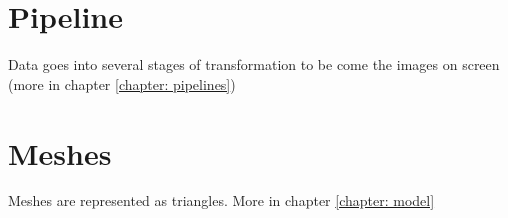 \section{Pipeline}

  Data goes into several stages of transformation to be come the images on
  screen (more in chapter \ref{chapter: pipelines})

\section{Meshes}

  Meshes are represented as triangles. More in chapter \ref{chapter: model}
